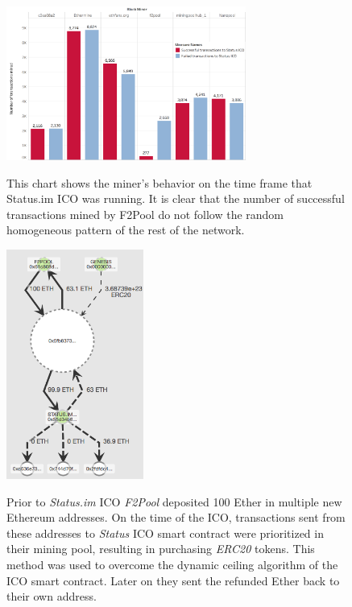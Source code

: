 \begin{figure}[t]
    \centering
{\includegraphics[width=0.7\textwidth]{figures/Transactions_miners_while_status_ico_cut_only_icotx.png}}
{\caption[Miner Behavior During the Time of Status.im ICO]{This chart shows the miner's behavior on the time frame that Status.im ICO was running. It is clear that the number of successful transactions mined by F2Pool do not follow the random homogeneous pattern of the rest of the network.}\label{fig:Transactions_miners_while_status_ico_cut}}
\end{figure}

\begin{figure}[t]
    \centering
{\includegraphics[width=0.4\textwidth]{figures/F2Pool_transactions_to_StatusICO_and_Refunds.png}}
{\caption[Status.im Funds Flow Visualization]{Prior to \textit{Status.im} ICO  \textit{F2Pool} deposited 100 Ether in multiple new Ethereum addresses. On the time of the ICO, transactions sent from these addresses to \textit{Status} ICO smart contract were prioritized in their mining pool, resulting in purchasing \textit{ERC20} tokens. This method was used to overcome the dynamic ceiling algorithm of the ICO smart contract. Later on they sent the refunded Ether back to their own address.\protect\footnotemark \label{fig:f2poolfront-run}}}
\end{figure}

